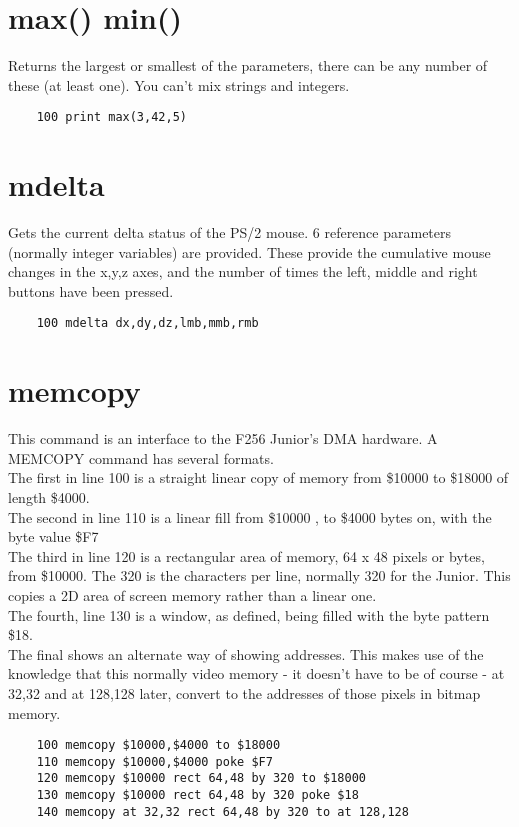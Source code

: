 \section*{max() min()}
Returns the largest or smallest of the parameters, there can be any number of these (at least one). You can’t mix strings and integers.
\example{}
\begin{verbatim}
	100 print max(3,42,5)
\end{verbatim}

\section*{mdelta}
Gets the current delta status of the PS/2 mouse. 6 reference parameters (normally integer variables) are provided. These provide the cumulative mouse changes in the x,y,z axes, and the number of times the left, middle and right buttons have been pressed.
\example{}
\begin{verbatim}
	100 mdelta dx,dy,dz,lmb,mmb,rmb
\end{verbatim}

\section*{memcopy}
This command is an interface to the F256 Junior's DMA hardware. A MEMCOPY command has several formats. \\
The first in line 100 is a straight linear copy of memory from \$10000 to \$18000 of length \$4000.\\ The second in line 110 is a linear fill from \$10000 , to \$4000 bytes on, with the byte value \$F7 \\
The third in line 120 is a rectangular area of memory, 64 x 48 pixels or bytes, from \$10000. The 320 is the characters per line, normally 320 for the Junior. This copies a 2D area of screen memory rather than a linear one. \\
The fourth, line 130 is a window, as defined, being filled with the byte pattern \$18. \\
The final shows an alternate way of showing addresses. This makes use of the knowledge that this normally video memory - it doesn't have to be of course - at 32,32 and at 128,128 later, convert to the addresses of those pixels in bitmap memory.
\begin{verbatim}
	100 memcopy $10000,$4000 to $18000
	110 memcopy $10000,$4000 poke $F7
	120 memcopy $10000 rect 64,48 by 320 to $18000
	130 memcopy $10000 rect 64,48 by 320 poke $18
	140 memcopy at 32,32 rect 64,48 by 320 to at 128,128
\end{verbatim}

